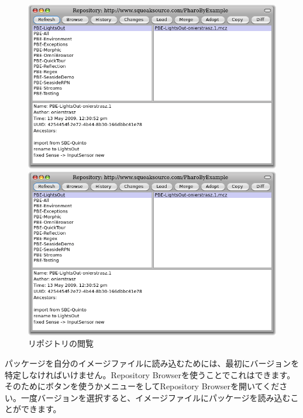 \documentclass[a4paper,10pt,twoside]{book}
\begin{document}
\begin{figure}[hbt]
\ifluluelse
	{\centerline {\includegraphics[width=\textwidth]{BrowseRepository}}}
	{\centerline {\includegraphics[scale=0.7]{BrowseRepository}}}
\caption{リポジトリの閲覧
}
\end{figure}


パッケージを自分のイメージファイルに読み込むためには、最初にバージョンを特定しなければいけません。Repository Browserを使うことでこれはできます。そのためにボタンを使うかメニューを\actclick してRepository Browserを開いてください。一度バージョンを選択すると、イメージファイルにパッケージを読み込むことができます。

\end{document}
